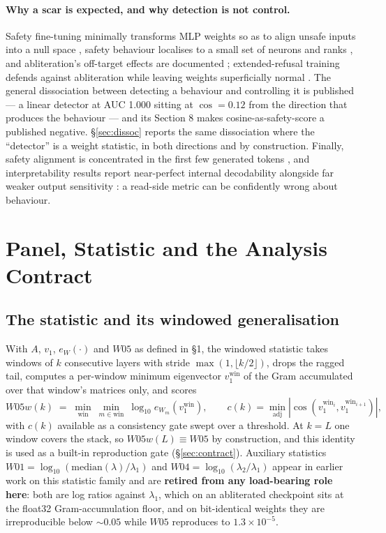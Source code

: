\documentclass[11pt,letterpaper]{article}
\begin{document}
\paragraph{Why a scar is expected, and why detection is not control.} Safety fine-tuning minimally transforms MLP weights so as to align unsafe inputs into a null space \citep{Jain2024}, safety behaviour localises to a small set of neurons and ranks \citep{Wei2024}, and abliteration's off-target effects are documented \citep{Agnihotri2025, Fafula2026}; extended-refusal training defends against abliteration while leaving weights superficially normal \citep{Shairah2025}. The general dissociation between detecting a behaviour and controlling it is published \citep{Galeone2026} --- a linear detector at AUC 1.000 sitting at $\cos = 0.12$ from the direction that produces the behaviour --- and its Section 8 makes cosine-as-safety-score a published negative. \S\ref{sec:dissoc} reports the same dissociation where the ``detector'' is a weight statistic, in both directions and by construction. Finally, safety alignment is concentrated in the first few generated tokens \citep{Qi2024}, and interpretability results report near-perfect internal decodability alongside far weaker output sensitivity \citep{Basu2026}: a read-side metric can be confidently wrong about behaviour.

\section{Panel, Statistic and the Analysis Contract}

\subsection{The statistic and its windowed generalisation}

With $A$, $v_1$, $e_W(\cdot)$ and $W05$ as defined in \S1, the windowed statistic takes windows of $k$ consecutive layers with stride $\max(1, \lfloor k/2\rfloor)$, drops the ragged tail, computes a per-window minimum eigenvector $v_1^{\text{win}}$ of the Gram accumulated over that window's matrices only, and scores
\[
W05w(k) \;=\; \min_{\text{win}}\ \min_{m\in\text{win}}\ \log_{10} e_{W_m}\!\left(v_1^{\text{win}}\right), \qquad c(k)=\min_{\text{adj}}\left|\cos\!\left(v_1^{\text{win}_i}, v_1^{\text{win}_{i+1}}\right)\right|,
\]
with $c(k)$ available as a consistency gate swept over a threshold. At $k = L$ one window covers the stack, so $W05w(L) \equiv W05$ by construction, and this identity is used as a built-in reproduction gate (\S\ref{sec:contract}). Auxiliary statistics $W01 = \log_{10}(\mathrm{median}(\lambda)/\lambda_1)$ and $W04 = \log_{10}(\lambda_2/\lambda_1)$ appear in earlier work on this statistic family and are \textbf{retired from any load-bearing role here}: both are log ratios against $\lambda_1$, which on an abliterated checkpoint sits at the float32 Gram-accumulation floor, and on bit-identical weights they are irreproducible below ${\sim}0.05$ while $W05$ reproduces to $1.3\times10^{-5}$.
\end{document}
